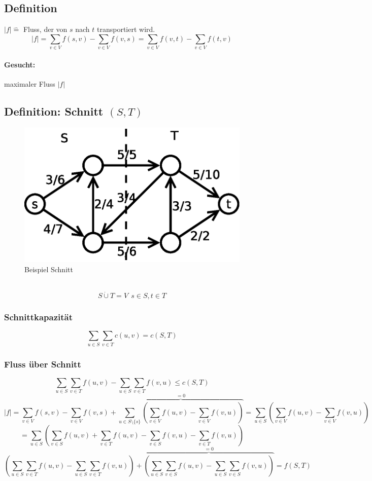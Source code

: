 \subsection{Definition}
$|f| \hat{=}$ Fluss, der von $s$ nach $t$ transportiert wird.
\[ |f| = \sum_{v\in V} f(s,v) - \sum_{v\in V} f(v,s) = \sum_{v\in V} f(v,t) - \sum_{v\in V} f(t,v) \]
\paragraph{Gesucht:} maximaler Fluss $|f|$
\pagebreak
\subsection{Definition: Schnitt $(S,T)$}
\begin{figure}
	\centering
	\includegraphics[width=\linewidth]{24/Grafik/Diagramm5}
	\caption{Beispiel Schnitt}
	\label{fig:Diagramm5}
\end{figure}
$ $
\[ S\dot{\cup} T = V~~ s\in S, t\in T \]
\subsubsection{Schnittkapazität}
\[ \sum_{u\in S}\sum_{v\in T} c(u,v) = c(S,T) \]
\subsubsection{Fluss über Schnitt}
\[ \sum_{u\in S}\sum_{v\in T} f(u,v) - \sum_{u\in S}\sum_{v\in T} f(v,u) \leq c(S,T) \]
\vspace{40pt}
\[ |f| = \sum_{v\in V} f(s,v) - \sum_{v \in V}f(v,s)+\overset{=0}{\overbrace{\sum_{u\in S\setminus\{ s \}} \left( \sum_{v\in V} f(u,v) - \sum_{v \in V} f(v,u) \right)   }} = \sum_{u \in S} \left(\sum_{v\in V}f(u,v)-\sum_{v \in V}f(v,u)   \right) \]
\[ =\sum_{u \in S}\left(  \sum_{v\in S} f(u,v)+\sum_{v\in T}f(u,v) - \sum_{v \in S}f(v,u)- \sum_{v\in T}f(v,u)  \right) \]
\[ \left( \sum_{u\in S}\sum_{v\in T} f(u,v) -\sum_{u\in S}\sum_{v\in T} f(v,u)  \right) + \overset{=0}{\overbrace{\left(  \sum_{u\in S}\sum_{v\in S}f(u,v) - \sum_{u\in S}\sum_{v\in S} f(v,u) \right)} } = f(S,T)\]

